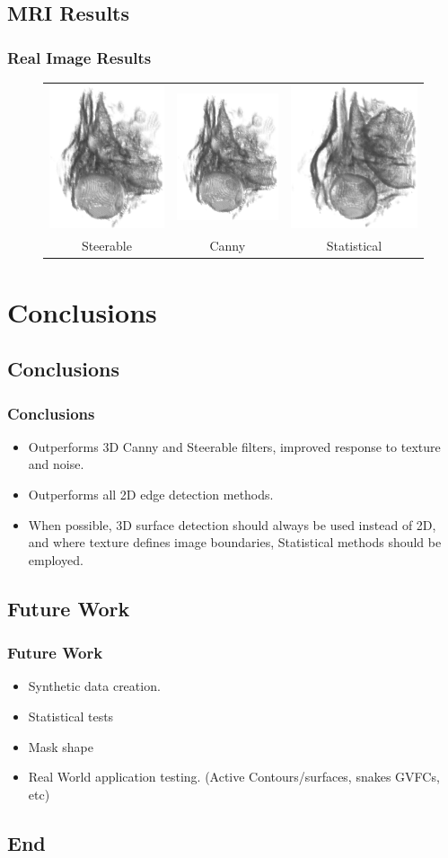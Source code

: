 \documentclass[9pt]{beamer}
\begin{document}
\subsection{MRI Results}
\begin{frame}
\frametitle{Real Image Results}
\begin{figure}
\begin{tabular}{c c c}
\includegraphics[scale=0.25]{headsteer}&\includegraphics[scale=0.25]{headcanny}&\includegraphics[scale=0.25]{headT}\\
Steerable & Canny & Statistical

\end{tabular}
\end{figure}
\end{frame}
\section{Conclusions}
\subsection{Conclusions}
\begin{frame}
\frametitle{Conclusions}
\begin{itemize}
\item Outperforms 3D Canny and Steerable filters, improved response to texture and noise.
\item Outperforms all 2D edge detection methods.
\item When possible, 3D surface detection should always be used instead of 2D, and where texture defines image boundaries, Statistical methods should be employed.
\end{itemize}
 
\end{frame}
\subsection{Future Work}
\begin{frame}
\frametitle{ Future Work }
\begin{itemize}
\item Synthetic data creation.
\item Statistical tests
\item Mask shape
\item Real World application testing. (Active Contours/surfaces, snakes GVFCs, etc) 
\end{itemize}
\end{frame}
\subsection{End}


	
	
\end{document}
